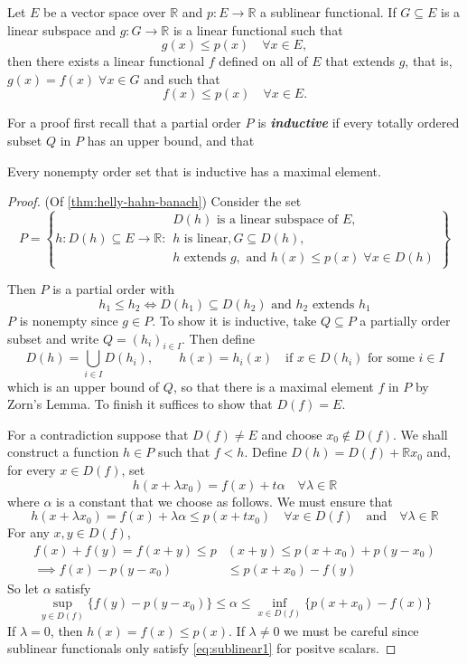 \documentclass{article}
\theoremstyle{definition}
\newcommand{\R}{\mathbb{R}}
\begin{document}
\begin{thm}\label{thm:helly-hahn-banach}
	Let $E$ be a vector space over $\R$ and $p:E\to\R$ a sublinear functional. If $G\subseteq E$ is a linear subspace and $g:G\to\R$ is a linear functional such that
	\[g(x)\leq p(x)\quad\forall x\in E,\]
	then there exists a linear functional $f$ defined on all of $E$ that extends $g$, that is, $g(x)=f(x)\;\forall x\in G$ and such that
	\[f(x)\leq p(x)\quad\forall x\in E.\]
\end{thm}
For a proof first recall that a partial order $P$ is \textbf{\textit{inductive}} if every totally ordered subset $Q$ in $P$ has an upper bound, and that
\begin{lemma}[Zorn]
	Every nonempty order set that is inductive has a maximal element.
\end{lemma}
\begin{proof} (Of \cref{thm:helly-hahn-banach})
	Consider the set
	\[P=\left\{h:D(h)\subseteq E\to\R:\substack{D(h)\text{ is a linear subspace of }E,\\
	h\text{ is linear},G\subseteq D(h),\\
	h\text{ extends }g,\text{ and }h(x)\leq p(x)\;\forall x\in D(h)
	}\right\}\]

Then $P$ is a partial order with
\[h_1\leq h_2\iff D(h_1)\subseteq D(h_2)\text{ and }h_2\text{ extends }h_1\]
$P$ is nonempty since $g\in P$. To show it is inductive, take $Q\subseteq P$ a partially order subset and write $Q=(h_i)_{i\in I}$. Then define
\[D(h)=\bigcup_{i\in I}D(h_i),\qquad h(x)=h_i(x)\quad\text{if }x\in D(h_i) \text{ for some }i\in I\]
which is an upper bound of $Q$, so that there is a maximal element $f$ in $P$ by Zorn's Lemma. To finish it suffices to show that $D(f)=E$.

For a contradiction suppose that $D(f)\neq E$ and choose $x_0\notin D(f)$. We shall construct a function $h\in P$ such that $f<h$. Define $D(h)=D(f)+\R x_0$ and, for every $x\in D(f)$, set
 \[h(x+\lambda x_0)=f(x)+t\alpha\quad \forall \lambda\in\R\]
 where $\alpha$ is a constant that we choose as follows. We must ensure that
\[h(x+\lambda x_0)=f(x)+\lambda\alpha\leq p(x+tx_0)\quad\forall x\in D(f)\quad\text{and}\quad\forall \lambda\in\R\]
For any $x,y\in D(f)$,
\begin{align*}
	f(x)+f(y)=f(x+y)\leq p&(x+y)\leq p(x+x_0)+p(y-x_0)\\
	\implies f(x)-p(y-x_0)&\leq p(x+x_0)-f(y)
\end{align*}
So let $\alpha$ satisfy
\[\sup_{y\in D(f)}\{f(y)-p(y-x_0)\}\leq\alpha\leq\inf_{x\in D(f)}\{p(x+x_0)-f(x)\}\]
If $\lambda =0$, then $h(x)=f(x)\leq p(x)$. If $\lambda\neq0$ we must be careful since sublinear functionals only satisfy \cref{eq:sublinear1} for positve scalars.


\end{proof}
\end{document}
